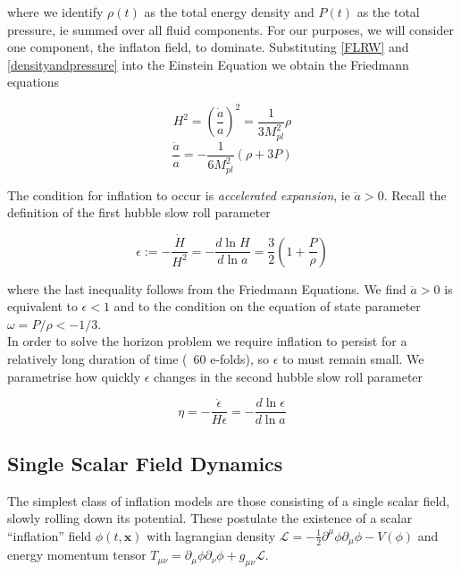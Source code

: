 \documentclass[a4paper,11pt]{article}
\renewcommand{\v}[1]{\mathbf{#1}}
\newcommand{\Mp}{M_{pl}}
\newcommand{\half}{\frac{1}{2}}
\begin{document}
where we  identify $\rho(t)$ as the total energy density and $P(t)$ as the total pressure, ie summed over all fluid components. For our purposes, we will consider one component, the inflaton field, to dominate.  Substituting \ref{FLRW} and \ref{densityandpressure} into the Einstein Equation we obtain the Friedmann equations

\begin{equation}
H^2 = (\frac{\dot{a}}{a})^2 = \frac{1}{3\Mp^2}\rho
\tag{F1}
\label{F1}
\end{equation}
\begin{equation}
\frac{\ddot{a}}{a} = -\frac{1}{6\Mp^2}(\rho + 3P)
\tag{F2}
\label{F2}
\end{equation}

The condition for inflation to occur is \textit{accelerated expansion}, ie $\ddot{a} >0$. Recall the definition of the first hubble slow roll parameter 

\begin{equation}
\label{epsilon}
\epsilon := -\frac{\dot{H}}{H^2} = -\frac{d\ln{H}}{d\ln{a}} = \frac{3}{2}(1+\frac{P}{\rho})
\end{equation}

where the last inequality follows from the Friedmann Equations. We find $\ddot{a} >0$ is equivalent to $\epsilon<1$ and to the condition on the equation of state parameter $\omega=P/\rho < -1/3$.\\ 

In order to solve the horizon problem we require inflation to persist for a relatively long duration of time (~60 e-folds), so $\epsilon$ to must remain small. We parametrise how quickly $\epsilon$ changes in the second hubble slow roll parameter 

\begin{equation}
\eta = -\frac{\dot{\epsilon}}{H\epsilon} = -\frac{d\ln{\epsilon}}{d\ln{a}}
\end{equation}

\subsection{Single Scalar Field Dynamics}

The simplest class of inflation models are those consisting of a single scalar field, slowly rolling down its potential. These postulate the existence of a scalar ``inflation'' field $\phi(t,\v{x})$ with lagrangian density $\mathcal{L} = -\half \partial^\mu \phi \partial_\mu \phi - V(\phi)$ and energy momentum tensor $T_{\mu\nu}= \partial_\mu \phi \partial_\nu \phi + g_{\mu\nu}\mathcal{L}$. \\
\end{document}
